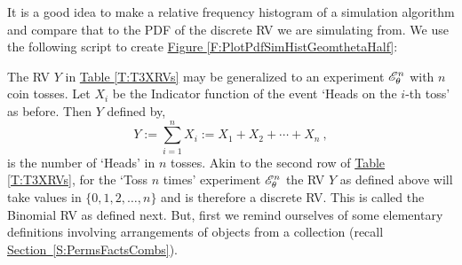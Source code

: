 \begin{labwork}\label{LW:RelFreqHistForGeomSims}
It is a good idea to make a relative frequency histogram of a simulation algorithm and compare that to the PDF of the discrete RV we are simulating from.  We use the following script to create \hyperref[F:PlotPdfSimHistGeomthetaHalf]{Figure \ref*{F:PlotPdfSimHistGeomthetaHalf}}:
\end{labwork}

The RV $Y$ in \hyperref[T:T3XRVs]{Table \ref*{T:T3XRVs}} may be generalized to an experiment $\mathscr{E}_{\theta}^{n}$ with $n$ coin tosses.  
Let $X_i$ be the Indicator function of the event `Heads on the $i$-th toss' as before.  Then $Y$ defined by,
 \[
 Y := \sum_{i=1}^n X_i := X_1 + X_2 + \cdots + X_n  \ ,
 \]
is the number of `Heads' in $n$ tosses.  
Akin to the second row of \hyperref[T:T3XRVs]{Table \ref*{T:T3XRVs}}, for the `Toss $n$ times' experiment $\mathscr{E}_{\theta}^{n}$ the
RV $Y$ as defined above will take values in $\{0,1,2,\ldots,n\}$ and is therefore a discrete RV.  This is called the Binomial RV as defined next.  
But, first we remind ourselves of some elementary definitions involving arrangements of objects from a collection (recall \hyperref[S:PermsFactsCombs]{Section~\ref*{S:PermsFactsCombs}}).

